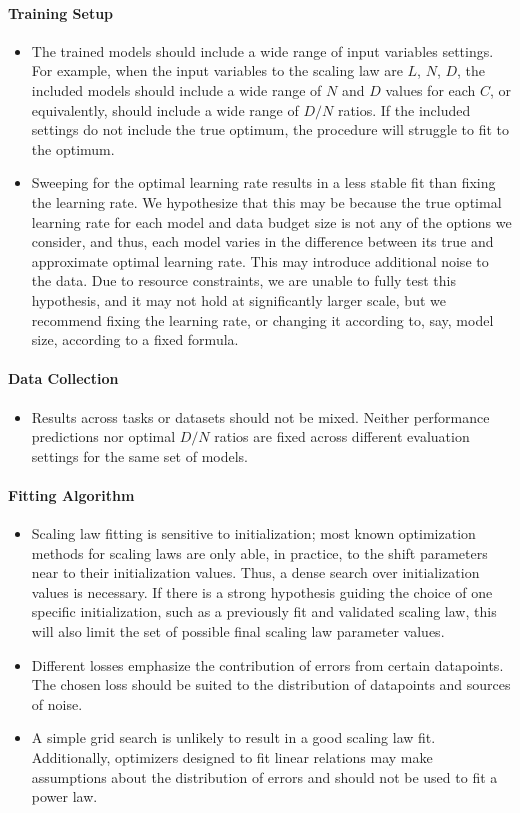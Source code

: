 \paragraph{Training Setup}
\begin{itemize}
    \item The trained models should include a wide range of input variables settings. For example, when the input variables to the scaling law are $L$, $N$, $D$, the included models should include a wide range of $N$ and $D$ values for each $C$, or equivalently, should include a wide range of $D/N$ ratios. If the included settings do not include the true optimum, the procedure will struggle to fit to the optimum.
    \item Sweeping for the optimal learning rate results in a less stable fit than fixing the learning rate. We hypothesize that this may be because the true optimal learning rate for each model and data budget size is not any of the options we consider, and thus, each model varies in the difference between its true and approximate optimal learning rate. This may introduce additional noise to the data. Due to resource constraints, we are unable to fully test this hypothesis, and it may not hold at significantly larger scale, but we recommend fixing the learning rate, or changing it according to, say, model size, according to a fixed formula.
\end{itemize}
\paragraph{Data Collection}
\begin{itemize}
    \item Results across tasks or datasets should not be mixed. Neither performance predictions nor optimal $D/N$ ratios are fixed across different evaluation settings for the same set of models.
\end{itemize}
\paragraph{Fitting Algorithm}
\begin{itemize}
    \item Scaling law fitting is sensitive to initialization; most known optimization methods for scaling laws are only able, in practice, to the shift parameters near to their initialization values. Thus, a  dense search over initialization values is necessary. If there is a strong hypothesis guiding the choice of one specific initialization, such as a previously fit and validated scaling law, this will also limit the set of possible final scaling law parameter values.
    \item Different losses emphasize the contribution of errors from certain datapoints. The chosen loss should be suited to the distribution of datapoints and sources of noise.
    \item A simple grid search is unlikely to result in a good scaling law fit. Additionally, optimizers designed to fit linear relations may make assumptions about the distribution of errors and should not be used to fit a power law. 
\end{itemize}


